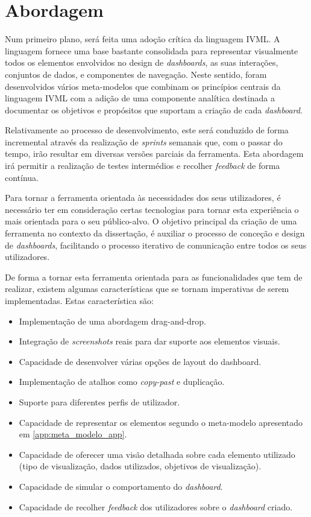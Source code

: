 \section{Abordagem} %
\label{sec:dashboard_abordagem}

Num primeiro plano, será feita uma adoção crítica da linguagem \gls{IVML}. A linguagem fornece uma base bastante consolidada para representar visualmente todos os elementos envolvidos no design de \textit{dashboards}, as suas interações, conjuntos de dados, e componentes de navegação. Neste sentido, foram desenvolvidos vários meta-modelos que combinam os princípios centrais da linguagem \gls{IVML} com a adição de uma componente analítica destinada a documentar os objetivos e propósitos que suportam a criação de cada \textit{dashboard}.

Relativamente ao processo de desenvolvimento, este será conduzido de forma incremental através da realização de \textit{sprints} semanais que, com o passar do tempo, irão resultar em diversas versões parciais da ferramenta. Esta abordagem irá permitir a realização de testes intermédios e recolher \textit{feedback} de forma contínua.

Para tornar a ferramenta orientada às necessidades dos seus utilizadores, é necessário ter em consideração certas tecnologias para tornar esta experiência o mais orientada para o seu público-alvo. O objetivo principal da criação de uma ferramenta no contexto da dissertação, é auxiliar o processo de conceção e design de \textit{dashboards}, facilitando o processo iterativo de comunicação entre todos os seus utilizadores.

De forma a tornar esta ferramenta orientada para as funcionalidades que tem de realizar, existem algumas características que se tornam imperativas de serem implementadas. Estas característica são:

\begin{itemize}
  \item Implementação de uma abordagem drag-and-drop.
  \item Integração de \textit{screenshots} reais para dar suporte aos elementos visuais.
  \item Capacidade de desenvolver várias opções de layout do dashboard.
  \item Implementação de atalhos como \textit{copy-past} e duplicação.
  \item Suporte para diferentes perfis de utilizador.
  \item Capacidade de representar os elementos segundo o meta-modelo apresentado em \ref{app:meta_modelo_app}.
  \item Capacidade de oferecer uma visão detalhada sobre cada elemento utilizado (tipo de visualização, dados utilizados, objetivos de visualização).
  \item Capacidade de simular o comportamento do \textit{dashboard}.
  \item Capacidade de recolher \textit{feedback} dos utilizadores sobre o \textit{dashboard} criado.
\end{itemize}

